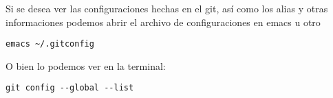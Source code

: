 Si se desea ver las configuraciones hechas en el git, as\'i como los alias y otras informaciones podemos abrir el archivo de configuraciones en emacs u otro

\begin{lstlisting}[numbers=none]
  emacs ~/.gitconfig
\end{lstlisting}

O bien lo podemos ver en la terminal:


\begin{lstlisting}[numbers=none]
  git config --global --list
\end{lstlisting}
